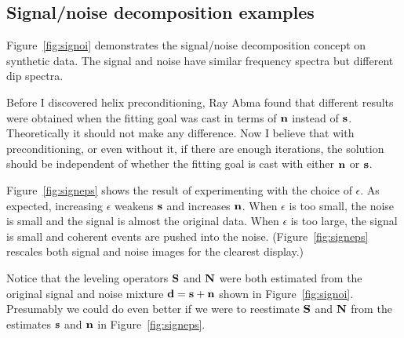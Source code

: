 \subsection{Signal/noise decomposition examples}
Figure~\ref{fig:signoi} demonstrates the
signal/noise decomposition concept on synthetic data.
The signal and noise have similar frequency spectra
but different dip spectra.


\par

\par
Before I discovered helix preconditioning,
Ray Abma found that different results were obtained when the
fitting goal was cast in terms of $\bold n$ instead of $\bold s$.
Theoretically it should not make any difference.
Now I believe that with preconditioning, or even without it,
if there are enough iterations,
the solution should be independent
of whether the fitting goal is cast with either $\bold n$ or $\bold s$.

\par
Figure~\ref{fig:signeps} shows the result of experimenting with
the choice of $\epsilon$.
As expected, increasing $\epsilon$
weakens $\bold s$ and increases $\bold n$.
When $\epsilon$ is too small,
                                the noise is small and
                                the signal is almost the original data.
When $\epsilon$ is too large,
                                the signal is small and
                                coherent events are pushed into the noise.
(Figure~\ref{fig:signeps}
rescales both signal and noise images for the clearest display.)

\par
Notice that the leveling operators
$\bold S$ and $\bold N$ were both estimated
from the original signal and noise mixture
$\bold d = \bold s +\bold n$
shown in Figure~\ref{fig:signoi}.
Presumably we could do even better if we were to reestimate
$\bold S$ and $\bold N$ from the estimates
$\bold s$ and $\bold n$ in Figure~\ref{fig:signeps}.



